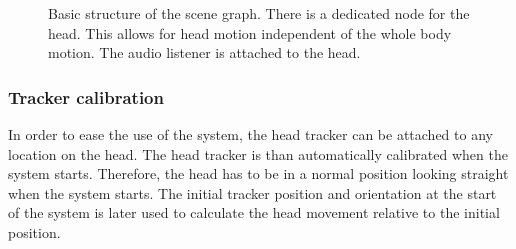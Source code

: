 \documentclass{sig-alternate}
\begin{document}

\begin{figure}
\centering
{}

\caption{Basic structure of the scene graph. There is a dedicated node for the
head. This allows for head motion independent of the whole body motion. The
audio listener is attached to the head.}
\label{fig:graph}
\end{figure}

\subsubsection{Tracker calibration}

In order to ease the use of the system, the head tracker can be attached to any
location on the head. The head tracker is than automatically calibrated when
the system starts. Therefore, the head has to be in a normal position looking
straight when the system starts. The initial tracker position and orientation at
the start of the system is later used to calculate the head movement relative to
the initial position.
\end{document}
